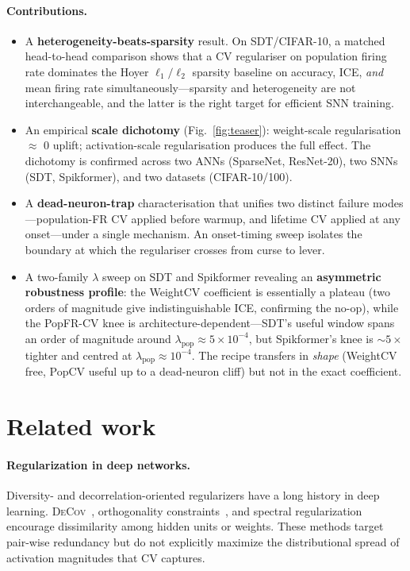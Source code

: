 \documentclass{article}
\begin{document}
\paragraph{Contributions.}
\begin{itemize}\itemsep0pt
\item[\textbf{C1.}] A \textbf{heterogeneity-beats-sparsity} result. On SDT/CIFAR-10, a matched head-to-head comparison shows that a CV regulariser on population firing rate dominates the Hoyer $\ell_1/\ell_2$ sparsity baseline on accuracy, ICE, \emph{and} mean firing rate simultaneously---sparsity and heterogeneity are not interchangeable, and the latter is the right target for efficient SNN training.
\item[\textbf{C2.}] An empirical \textbf{scale dichotomy} (Fig.~\ref{fig:teaser}): weight-scale regularisation $\approx$ 0 uplift; activation-scale regularisation produces the full effect. The dichotomy is confirmed across two ANNs (SparseNet, ResNet-20), two SNNs (SDT, Spikformer), and two datasets (CIFAR-10/100).
\item[\textbf{C3.}] A \textbf{dead-neuron-trap} characterisation that unifies two distinct failure modes---population-FR CV applied before warmup, and lifetime CV applied at any onset---under a single mechanism. An onset-timing sweep isolates the boundary at which the regulariser crosses from curse to lever.
\item[\textbf{C4.}] A two-family $\lambda$ sweep on SDT and Spikformer revealing an \textbf{asymmetric robustness profile}: the WeightCV coefficient is essentially a plateau (two orders of magnitude give indistinguishable ICE, confirming the no-op), while the PopFR-CV knee is architecture-dependent---SDT's useful window spans an order of magnitude around $\lambda_{\text{pop}}\!\approx\!5\!\times\!10^{-4}$, but Spikformer's knee is $\sim 5\times$ tighter and centred at $\lambda_{\text{pop}}\!\approx\!10^{-4}$. The recipe transfers in \emph{shape} (WeightCV free, PopCV useful up to a dead-neuron cliff) but not in the exact coefficient.
\end{itemize}

\section{Related work}
\label{sec:related}

\paragraph{Regularization in deep networks.} Diversity- and decorrelation-oriented regularizers have a long history in deep learning. \textsc{DeCov}~\cite{cogswell2016decov}, orthogonality constraints~\cite{bansal2018can}, and spectral regularization~\cite{yoshida2017spectral} encourage dissimilarity among hidden units or weights. These methods target pair-wise redundancy but do not explicitly maximize the distributional spread of activation magnitudes that CV captures.
\end{document}
